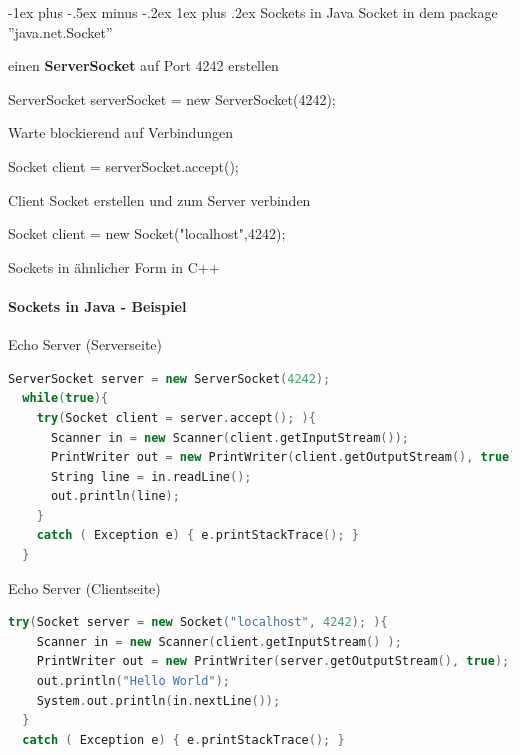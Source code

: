\documentclass[10pt]{article}
\makeatletter
\renewcommand{\subsubsection}{\@startsection{subsubsection}{3}{0mm}%
                                {-1ex plus -.5ex minus -.2ex}%
                                {1ex plus .2ex}%
                                {\normalfont\small\bfseries}}
\makeatother
\begin{document}
  \subsubsection{Sockets in Java}
  Socket in dem package ''java.net.Socket''
  \begin{itemize*}
    \item einen \textbf{ServerSocket} auf Port 4242 erstellen 
    \begin{center}
      ServerSocket serverSocket = new ServerSocket(4242); 
    \end{center}
    \item Warte \color{orange}blockierend \color{black} auf Verbindungen
    \begin{center}
      Socket client = serverSocket.accept(); 
    \end{center}
    \item Client Socket erstellen und zum Server verbinden
    \begin{center}
      Socket client = new Socket("localhost",4242); 
    \end{center}
    \item Sockets in ähnlicher Form in C++
  \end{itemize*}
  
  \paragraph{Sockets in Java - Beispiel}
  
  Echo Server (Serverseite)
  \begin{lstlisting}[language=C++]
  ServerSocket server = new ServerSocket(4242);
  while(true){
    try(Socket client = server.accept(); ){
      Scanner in = new Scanner(client.getInputStream());
      PrintWriter out = new PrintWriter(client.getOutputStream(), true);
      String line = in.readLine();
      out.println(line);
    }
    catch ( Exception e) { e.printStackTrace(); }
  }
\end{lstlisting}
  
  Echo Server (Clientseite)
  \begin{lstlisting}[language=C++]
  try(Socket server = new Socket("localhost", 4242); ){
    Scanner in = new Scanner(client.getInputStream() );
    PrintWriter out = new PrintWriter(server.getOutputStream(), true);
    out.println("Hello World");
    System.out.println(in.nextLine());
  }
  catch ( Exception e) { e.printStackTrace(); }
\end{lstlisting}
  
\end{document}
